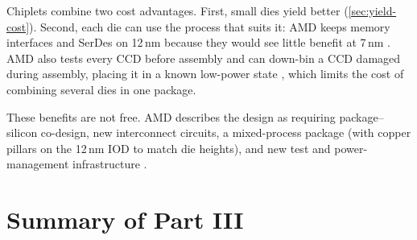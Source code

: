 Chiplets combine two cost advantages. First, small dies yield better (\cref{sec:yield-cost}). Second, each die can use the process that suits it: AMD keeps memory interfaces and SerDes on 12\,nm because they would see little benefit at 7\,nm \cite{naffziger2020chiplet}. AMD also tests every CCD before assembly and can down-bin a CCD damaged during assembly, placing it in a known low-power state \cite{naffziger2020chiplet}, which limits the cost of combining several dies in one package.

These benefits are not free. AMD describes the design as requiring package--silicon co-design, new interconnect circuits, a mixed-process package (with copper pillars on the 12\,nm IOD to match die heights), and new test and power-management infrastructure \cite{naffziger2020chiplet}.


\section{Summary of Part III}
